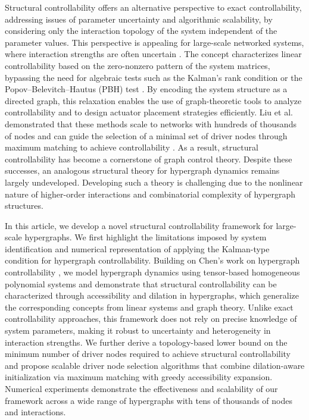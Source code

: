 \documentclass[journal,twoside,web]{ieeecolor}
\begin{document}
Structural controllability offers an alternative perspective to exact controllability, addressing issues of parameter uncertainty and algorithmic scalability, by considering only the interaction topology of the system independent of the parameter values.
%
This perspective is appealing for large-scale networked systems, where interaction strengths are often uncertain \cite{liu2011controllability, chapman2013strong, liu2016control, lee2020heritability}.
%
The concept characterizes linear controllability based on the zero-nonzero pattern of the system matrices, bypassing the need for algebraic tests such as the Kalman's rank condition or the Popov--Belevitch--Hautus (PBH) test \cite{gilbert1963controllability, kalman1963mathematical, kalman1968lectures, popov1973hyperstability}.
%
By encoding the system structure as a directed graph, this relaxation enables the use of graph-theoretic tools to analyze controllability and to design actuator placement strategies efficiently.
%
Liu et al. demonstrated that these methods scale to networks with hundreds of thousands of nodes and can guide the selection of a minimal set of driver nodes through maximum matching  to achieve controllability \cite{liu2011controllability}.
%
As a result, structural controllability has become a cornerstone of graph control theory.
%
Despite these successes, an analogous structural theory for hypergraph dynamics remains largely undeveloped.
%
Developing such a theory is challenging due to the  nonlinear nature of higher-order interactions and combinatorial complexity of hypergraph structures.



In this article, we develop a novel structural controllability framework for large-scale hypergraphs.
%
We first highlight the limitations imposed by system identification and numerical representation of applying the Kalman-type condition for hypergraph controllability.
%
Building on Chen’s work on  hypergraph controllability \cite{chen2021controllability}, we model hypergraph dynamics using tensor-based homogeneous polynomial  systems and demonstrate that structural controllability can be characterized through accessibility and dilation in hypergraphs, which generalize the corresponding concepts from linear systems and graph theory.
%
Unlike exact controllability approaches, this framework does not rely on precise knowledge of system parameters, making it robust to uncertainty and heterogeneity in interaction strengths.
%
We further derive a topology-based lower bound on the minimum number of driver nodes required to achieve structural controllability and propose scalable driver node selection algorithms that combine dilation-aware initialization via maximum matching with greedy accessibility expansion.
%
Numerical experiments demonstrate the effectiveness and scalability of our framework  across a wide range of  hypergraphs with tens of thousands of nodes and interactions. 
\end{document}
